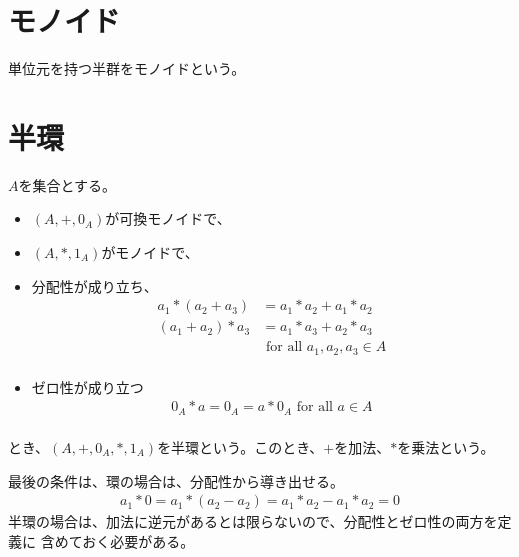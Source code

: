 \section{モノイド}\label{s1:モノイド} %
	\begin{definition}[モノイド]\label{def:モノイド} %
		単位元を持つ半群をモノイドという。
	\end{definition} %

\section{半環}\label{s1:半環} %
	\begin{definition}[半環]\label{def:半環} %
		$A$を集合とする。
		\begin{itemize}
			\item $(A,+,0_A)$が可換モノイドで、
			\item $(A,*,1_A)$がモノイドで、
			\item 分配性が成り立ち、
			\begin{equation*}\begin{split} %
				a_1*(a_2+a_3) &= a_1*a_2+a_1*a_2 \\
				(a_1+a_2)*a_3 &= a_1*a_3+a_2*a_3 \\
				& \text{ for all }a_1,a_2,a_3 \in A \\
			\end{split}\end{equation*} %
			\item ゼロ性が成り立つ
			\begin{equation*}\begin{split} %
				0_A*a = 0_A = a*0_A \text{ for all }a\in A \\
			\end{split}\end{equation*} %
		\end{itemize}
		とき、$(A,+,0_A,*,1_A)$を半環という。このとき、$+$を加法、$*$を乗法という。
	\end{definition} %

	最後の条件は、環の場合は、分配性から導き出せる。
	\begin{equation*}\begin{split} %
		a_1*0=a_1*(a_2-a_2)=a_1*a_2-a_1*a_2=0
	\end{split}\end{equation*} %
	半環の場合は、加法に逆元があるとは限らないので、分配性とゼロ性の両方を定義に
	含めておく必要がある。

